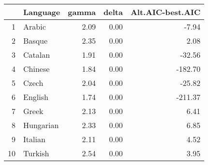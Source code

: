 \begin{table}[ht]
\centering
\begin{tabular}{rlrrr}
  \hline
 & Language & gamma & delta & Alt.AIC-best.AIC \\ 
  \hline
1 & Arabic & 2.09 & 0.00 & -7.94 \\ 
  2 & Basque & 2.35 & 0.00 & 2.08 \\ 
  3 & Catalan & 1.91 & 0.00 & -32.56 \\ 
  4 & Chinese & 1.84 & 0.00 & -182.70 \\ 
  5 & Czech & 2.04 & 0.00 & -25.82 \\ 
  6 & English & 1.74 & 0.00 & -211.37 \\ 
  7 & Greek & 2.13 & 0.00 & 6.41 \\ 
  8 & Hungarian & 2.33 & 0.00 & 6.85 \\ 
  9 & Italian & 2.11 & 0.00 & 4.52 \\ 
  10 & Turkish & 2.54 & 0.00 & 3.95 \\ 
   \hline
\end{tabular}
\end{table}
